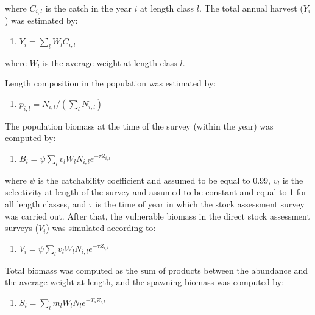 \documentclass[12pt]{article}
\providecommand{\tightlist}{%
  \setlength{\itemsep}{0pt}\setlength{\parskip}{0pt}}
\begin{document}
where \(C_{i,l}\) is the catch in the year \(i\) at length class \(l\).
The total annual harvest (\(Y_i\)) was estimated by:

\begin{enumerate}
\def\labelenumi{\arabic{enumi})}
\setcounter{enumi}{8}
\tightlist
\item
  \(Y_i=\sum_l W_l C_{i,l}\)
\end{enumerate}

where \(W_l\) is the average weight at length class \(l\).

Length composition in the population was estimated by:

\begin{enumerate}
\def\labelenumi{\arabic{enumi})}
\setcounter{enumi}{9}
\tightlist
\item
  \(p_{i,l}=N_{i,l}/(\sum_l N_{i,l})\)
\end{enumerate}

The population biomass at the time of the survey (within the year) was
computed by:

\begin{enumerate}
\def\labelenumi{\arabic{enumi})}
\setcounter{enumi}{10}
\tightlist
\item
  \(B_i=\psi \sum_l v_l W_l N_{i,l} e^{-\tau Z_{i,l}}\)
\end{enumerate}

where \(\psi\) is the catchability coefficient and assumed to be equal
to 0.99, \(v_l\) is the selectivity at length of the survey and assumed
to be constant and equal to 1 for all length classes, and \(\tau\) is
the time of year in which the stock assessment survey was carried out.
After that, the vulnerable biomass in the direct stock assessment
surveys (\(V_i\)) was simulated according to:

\begin{enumerate}
\def\labelenumi{\arabic{enumi})}
\setcounter{enumi}{11}
\tightlist
\item
  \(V_i = \psi \sum_l v_l W_l N_{i,l} e^{-\tau Z_{i,l}}\)
\end{enumerate}

Total biomass was computed as the sum of products between the abundance
and the average weight at length, and the spawning biomass was computed
by:

\begin{enumerate}
\def\labelenumi{\arabic{enumi})}
\setcounter{enumi}{12}
\tightlist
\item
  \(S_i=\sum_l m_l W_l N_l e^{-T_s Z_{i,l}}\)
\end{enumerate}
\end{document}

